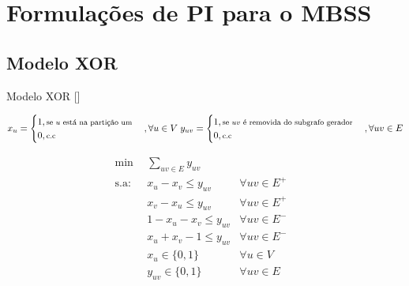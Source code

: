 \documentclass[
12pt,notheorems,hyperref={pdfauthor=whatever}
]{beamer}
\begin{document}
\section{Formulações de PI para o MBSS}
\subsection{Modelo XOR}
\begin{frame}
    \begin{block}{Modelo XOR [\cite{aref2020modeling}]}
        \begingroup
            \begin{center}
                \footnotesize
                $x_u=
                \begin{cases}
                    1, \text{\footnotesize se $u$ está na partição um}\\
                    0, \text{\footnotesize c.c}
                \end{cases}
                \text{$,\forall u \in V$}
                \;
                y_{uv}=
                \begin{cases}
                    1, \text{\footnotesize se $uv$ é removida do subgrafo gerador}\\
                    0, \text{\footnotesize c.c}
                \end{cases}
                \text{$, \forall uv \in E$}
                $
            \end{center}
            \begin{align} 
                 \min\:\:&\sum_{uv \in E} y_{uv} & & \\
                \text{s.a}:\:&x_u-x_v \leq y_{uv} &\forall uv\in E^+ \label{eq:pos1}\\
                &x_v-x_u \leq y_{uv} &\forall uv\in E^+ \label{eq:pos2}\\
                &1 - x_u - x_v \leq y_{uv} &\forall uv\in E^- \label{eq:neg1}\\
                & x_u+x_v -1 \leq y_{uv} &\forall uv\in E^- \label{eq:neg2}\\
                &x_u \in \{0,1\} &\forall u \in V\\
                &y_{uv} \in \{0,1\} &\forall uv \in E \label{eq:ybin}
            \end{align}  
        \endgroup
    \end{block}
\end{frame}
\end{document}
